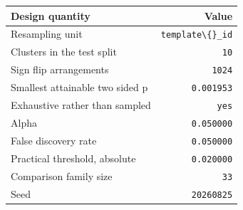 \begingroup\small\setlength{\tabcolsep}{4pt}
\begin{tabular}{lr}
\toprule
\textbf{Design quantity} & \textbf{Value} \\
\midrule
Resampling unit & \texttt{template\textbackslash\{\}\_id} \\
Clusters in the test split & \texttt{10} \\  %
Sign flip arrangements & \texttt{1024} \\  %
Smallest attainable two sided p & \texttt{0.001953} \\  %
Exhaustive rather than sampled & \texttt{yes} \\
Alpha & \texttt{0.050000} \\  %
False discovery rate & \texttt{0.050000} \\  %
Practical threshold, absolute & \texttt{0.020000} \\  %
Comparison family size & \texttt{33} \\  %
Seed & \texttt{20260825} \\  %
\bottomrule
\end{tabular}
\endgroup
\par\smallskip{}
